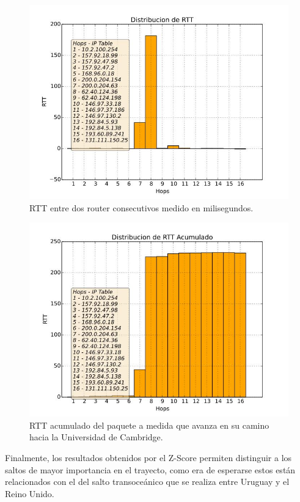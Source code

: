 \begin{figure}[H]
  \centering	
	\includegraphics[scale=0.4]{../cambridge-experiment/bar_rtt.jpeg}
  \caption{RTT entre dos router consecutivos medido en milisegundos.}
	\label{fig:histo-src-sitiotrabajo}
\end{figure}

\begin{figure}[H]
  \centering	
	\includegraphics[scale=0.4]{../cambridge-experiment/bar_rtt_acum.jpeg}
  \caption{RTT acumulado del paquete a medida que avanza en su camino hacia la Universidad de Cambridge.}
	\label{fig:histo-src-sitiotrabajo}
\end{figure}

Finalmente, los resultados obtenidos por el Z-Score permiten distinguir a los saltos de mayor importancia en el trayecto, como era de esperarse estos están relacionados con el del salto transoceánico que se realiza entre Uruguay y el Reino Unido.

